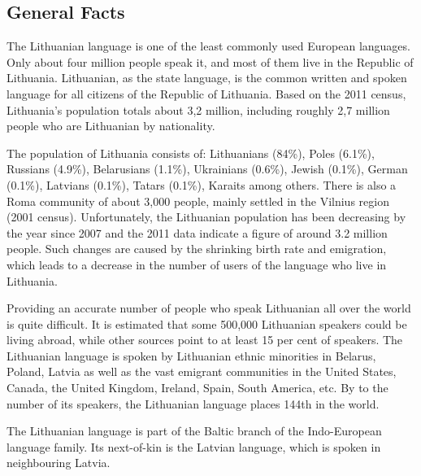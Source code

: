 \documentclass[]{../metanetpaper}
\begin{document}
\clearpage


\begin{multicols}{2}

\subsection{General Facts}

The Lithuanian language is one of the least commonly used European languages. Only about four million people speak it, and most of them live in the Republic of Lithuania. Lithuanian, as the state language, is the common written and spoken language for all citizens of the Republic of Lithuania. Based on the 2011 census, Lithuania’s population totals about 3,2 million, including roughly 2,7 million people who are Lithuanian by nationality. 

   The population of Lithuania consists of: Lithuanians (84\%), Poles (6.1\%), Russians (4.9\%), Belarusians (1.1\%), Ukrainians (0.6\%), Jewish (0.1\%), German (0.1\%), Latvians (0.1\%), Tatars (0.1\%), Karaits among others.  There is also a Roma community of about 3,000 people, mainly settled in the Vilnius region (2001 census). Unfortunately, the Lithuanian population has been decreasing by the year since 2007 and the 2011 data indicate a figure of around 3.2 million people. Such changes are caused by the shrinking birth rate and emigration, which leads to a decrease in the number of users of the language who live in Lithuania.

    Providing an accurate number of people who speak Lithuanian all over the world is quite difficult. It is estimated that some 500,000 Lithuanian speakers could be living abroad, while other sources point to at least 15 per cent of speakers. The Lithuanian language is spoken by Lithuanian ethnic minorities in Belarus, Poland, Latvia as well as the vast emigrant communities in the United States, Canada, the United Kingdom, Ireland, Spain, South America, etc. By to the number of its speakers, the Lithuanian language places 144th in the world.


The Lithuanian language is part of the Baltic branch of the Indo-European language family. Its next-of-kin is the Latvian language, which is spoken in neighbouring Latvia.


\end{multicols}
\end{document}
